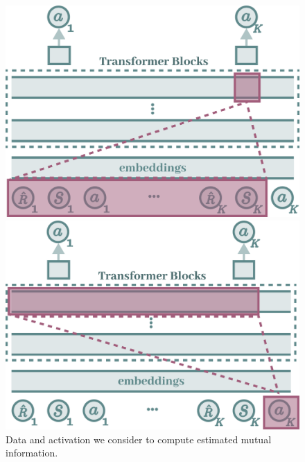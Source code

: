 \documentclass{article}
\begin{document}
\begin{figure}[ht]
    \centering
    \begin{minipage}[b]{0.4\linewidth}
    \includegraphics[width=\linewidth]{figs/diagram_mi_x.pdf}
    \end{minipage}
    \hspace{1cm}
    \begin{minipage}[b]{0.4\linewidth}
    \includegraphics[width=\linewidth]{figs/diagram_mi_y.pdf}
    \end{minipage}
    \caption{Data and activation we consider to compute estimated mutual information.}
    \label{fig:diagram_mutual_information_context}
\end{figure}
\end{document}
